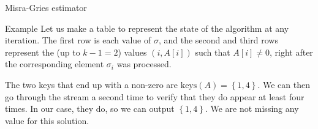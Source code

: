 \documentclass[a4paper]{article}
\begin{document}
\begin{parag}{Misra-Gries estimator}
\begin{subparag}{Example}
        Let us make a table to represent the state of the algorithm at any iteration. The first row is each value of $\sigma$, and the second and third rows represent the (up to $k - 1 = 2$) values $\left(i, A\left[i\right]\right)$ such that $A\left[i\right] \neq 0$, right after the corresponding element $\sigma_i$ was processed.
        \begin{center}
            \renewcommand{\arraystretch}{1.75}
            \renewcommand{\arraystretch}{1}
        \end{center}

        The two keys that end up with a non-zero are $\text{keys}\left(A\right) = \left\{1, 4\right\}$. We can then go through the stream a second time to verify that they do appear at least four times. In our case, they do, so we can output $\left\{1, 4\right\}$. We are not missing any value for this solution.
    \end{subparag}
\end{parag}
\end{document}
